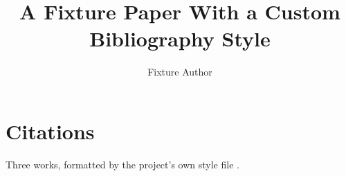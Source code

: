 \documentclass[11pt]{article}
\title{A Fixture Paper With a Custom Bibliography Style}
\author{Fixture Author}
\date{}
\begin{document}
\maketitle

\section{Citations}
Three works, formatted by the project's own style file
\cite{paszkePyTorchImperativeStyle2019, carrionKubernetesSchedulingTaxonomy2022,
      grattafioriLlama3Herd2024}.



\end{document}
